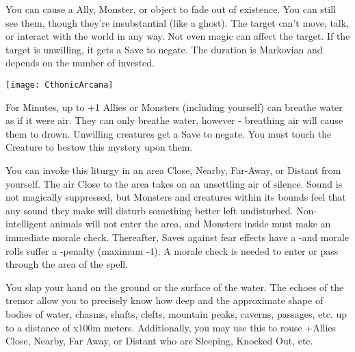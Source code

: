You can cause a Ally, Monster, or object to fade out of existence.  You can still see them, though they're insubstantial (like a ghost).  The target can't move, talk, or interact with the world in any way.  Not even magic can affect the target.  If the target is unwilling, it gets a Save to negate.  The duration is Markovian and depends on the number of \DICE invested.

  \begin{center}
  \texttt{[image: CthonicArcana]}
  \end{center}


\MYSTERY [
  Name = Mermaid's Breath,
  Link = arcana-mystery-mermaids-breath,
  Paradigm = Biomancy,
  Save = Y (neg.),
  Duration = \SUM Minutes,
  Target = Self or Close Target(s)
]

For \SUMDICE Minutes, up to \DICE+1 Allies or Monsters (including yourself) can breathe water as if it were air.  They can only breathe water, however - breathing air will cause them to drown. Unwilling creatures get a Save to negate.  You must touch the Creature to bestow this mystery upon them. 

\MYSTERY [
  Name = Sinister Stillness,
  Link = arcana-mystery-sinister-stillness,
  Paradigm = Mind,
  Save = N,
  Duration = Combat or \SUM Minutes,
  Target = Close\, Nearby\, Far-Away\, or Distant
]

You can invoke this liturgy in an area  Close, Nearby, Far-Away, or Distant from yourself.  The air Close to the area takes on an unsettling air of silence.  Sound is not magically suppressed, but Monsters and creatures within its bounds feel that any sound they make will disturb something better left undisturbed.  Non-intelligent animals will not enter the area, and Monsters inside must make an immediate morale check. Thereafter, Saves against fear effects have a -\DICE and morale rolls suffer a -\DICE penalty (maximum -4).  A morale check is needed to enter or pass through the area of the spell.

\MYSTERY [
  Name = Sound the Deeps,
  Link = arcana-mystery-sound-the-deeps,
  Paradigm = Force,
  Save = N,
  Duration = Instant,
  Target = Close Target(s)
]

You slap your hand on the ground or the surface of the water.  The echoes of the tremor allow you to precisely know how deep and the approximate shape of bodies of water, chasms, shafts, clefts, mountain peaks, caverns, passages, etc.  up to a distance of \DICE x100m meters.  Additionally, you may use this to rouse \DICE+\DICE Allies Close, Nearby, Far Away, or Distant who are Sleeping, Knocked Out, etc. 


